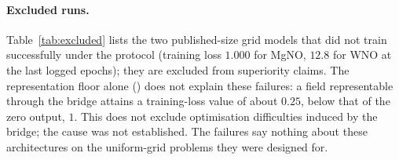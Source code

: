 \paragraph{Excluded runs.} Table~\ref{tab:excluded} lists the two published-size grid models that did not train successfully
under the protocol (training loss $1.000$ for MgNO, $12.8$ for WNO at the last logged epochs); they are excluded from
superiority claims. The representation floor alone () does not explain these failures: a field
representable through the bridge attains a training-loss value of about $0.25$, below that of the zero output, $1$. This does not
exclude optimisation difficulties induced by the bridge; the cause was not established. The failures say nothing about these
architectures on the uniform-grid problems they were designed for.

